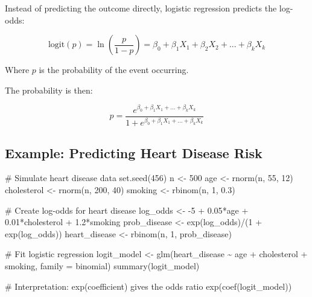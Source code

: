 \documentclass[
  11pt,
  letterpaper,
  oneside]{book}
\newenvironment{Shaded}{\begin{snugshade}}{\end{snugshade}}
\newcommand{\AttributeTok}[1]{\textcolor[rgb]{0.40,0.45,0.13}{#1}}
\newcommand{\CommentTok}[1]{\textcolor[rgb]{0.37,0.37,0.37}{#1}}
\newcommand{\DecValTok}[1]{\textcolor[rgb]{0.68,0.00,0.00}{#1}}
\newcommand{\FloatTok}[1]{\textcolor[rgb]{0.68,0.00,0.00}{#1}}
\newcommand{\FunctionTok}[1]{\textcolor[rgb]{0.28,0.35,0.67}{#1}}
\newcommand{\NormalTok}[1]{\textcolor[rgb]{0.00,0.23,0.31}{#1}}
\newcommand{\OtherTok}[1]{\textcolor[rgb]{0.00,0.23,0.31}{#1}}
\newcommand{\SpecialCharTok}[1]{\textcolor[rgb]{0.37,0.37,0.37}{#1}}
\begin{document}
Instead of predicting the outcome directly, logistic regression predicts
the log-odds:

\[\text{logit}(p) = \ln\left(\frac{p}{1-p}\right) = \beta_0 + \beta_1 X_1 + \beta_2 X_2 + ... + \beta_k X_k\]

Where \(p\) is the probability of the event occurring.

The probability is then:

\[p = \frac{e^{\beta_0 + \beta_1 X_1 + ... + \beta_k X_k}}{1 + e^{\beta_0 + \beta_1 X_1 + ... + \beta_k X_k}}\]

\subsection{Example: Predicting Heart Disease
Risk}\label{example-predicting-heart-disease-risk}

\begin{Shaded}
\begin{Highlighting}[]
\CommentTok{\# Simulate heart disease data}
\FunctionTok{set.seed}\NormalTok{(}\DecValTok{456}\NormalTok{)}
\NormalTok{n }\OtherTok{\textless{}{-}} \DecValTok{500}
\NormalTok{age }\OtherTok{\textless{}{-}} \FunctionTok{rnorm}\NormalTok{(n, }\DecValTok{55}\NormalTok{, }\DecValTok{12}\NormalTok{)}
\NormalTok{cholesterol }\OtherTok{\textless{}{-}} \FunctionTok{rnorm}\NormalTok{(n, }\DecValTok{200}\NormalTok{, }\DecValTok{40}\NormalTok{)}
\NormalTok{smoking }\OtherTok{\textless{}{-}} \FunctionTok{rbinom}\NormalTok{(n, }\DecValTok{1}\NormalTok{, }\FloatTok{0.3}\NormalTok{)}

\CommentTok{\# Create log{-}odds for heart disease}
\NormalTok{log\_odds }\OtherTok{\textless{}{-}} \SpecialCharTok{{-}}\DecValTok{5} \SpecialCharTok{+} \FloatTok{0.05}\SpecialCharTok{*}\NormalTok{age }\SpecialCharTok{+} \FloatTok{0.01}\SpecialCharTok{*}\NormalTok{cholesterol }\SpecialCharTok{+} \FloatTok{1.2}\SpecialCharTok{*}\NormalTok{smoking}
\NormalTok{prob\_disease }\OtherTok{\textless{}{-}} \FunctionTok{exp}\NormalTok{(log\_odds)}\SpecialCharTok{/}\NormalTok{(}\DecValTok{1} \SpecialCharTok{+} \FunctionTok{exp}\NormalTok{(log\_odds))}
\NormalTok{heart\_disease }\OtherTok{\textless{}{-}} \FunctionTok{rbinom}\NormalTok{(n, }\DecValTok{1}\NormalTok{, prob\_disease)}

\CommentTok{\# Fit logistic regression}
\NormalTok{logit\_model }\OtherTok{\textless{}{-}} \FunctionTok{glm}\NormalTok{(heart\_disease }\SpecialCharTok{\textasciitilde{}}\NormalTok{ age }\SpecialCharTok{+}\NormalTok{ cholesterol }\SpecialCharTok{+}\NormalTok{ smoking,}
                   \AttributeTok{family =}\NormalTok{ binomial)}
\FunctionTok{summary}\NormalTok{(logit\_model)}

\CommentTok{\# Interpretation: exp(coefficient) gives the odds ratio}
\FunctionTok{exp}\NormalTok{(}\FunctionTok{coef}\NormalTok{(logit\_model))}
\end{Highlighting}
\end{Shaded}
\end{document}
